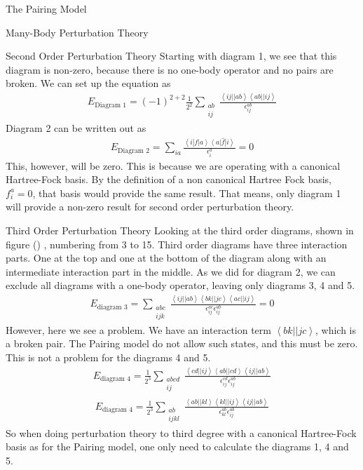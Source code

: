 \documentclass[twoside,english]{uiofysmaster}
\begin{document}
\begin{chapter}{The Pairing Model}
\begin{section}{Many-Body Perturbation Theory}
		\begin{subsection}{Second Order Perturbation Theory}
			Starting with diagram 1, we see that this diagram is non-zero, because there is no one-body operator and no pairs are broken. We can set up the equation as
			\begin{align}
				E_\text{Diagram 1} = (-1)^{2+2} \frac{1}{2^2} \sum_{\substack{ab \\ ij}} \frac{\left< ij || ab \right> \left< ab || ij \right>}{\epsilon_{ij}^{ab}}
			\end{align}
			Diagram 2 can be written out as
			\begin{align}
				E_\text{Diagram 2} = \sum_{ia} \frac{\left<i\right|f\left|a\right> \left<a\right| \hat f \left| i \right>}{\epsilon_i^a} = 0
			\end{align}
			This, however, will be zero. This is because we are operating with a canonical Hartree-Fock basis. By the definition of a non canonical Hartree Fock basis, $f_i^a = 0$, that basis would provide the same result. That means, only diagram 1 will provide a non-zero result for second order perturbation theory. 

		\end{subsection}

		\begin{subsection}{Third Order Perturbation Theory}
			Looking at the third order diagrams, shown in figure () , numbering from 3 to 15. Third order diagrams have three interaction parts. One at the top and one at the bottom of the diagram along with an intermediate interaction part in the middle. As we did for diagram 2, we can exclude all diagrams with a one-body operator, leaving only diagrams 3, 4 and 5. 
			\begin{align}
				E_{\text{diagram 3}} = \sum_{\substack{abc \\ ijk}} \frac{\left<ij||ab\right>\left<bk||jc\right>\left<ac||ij\right>}{\epsilon_{ij}^{ac} \epsilon_{ij}^{ab}} = 0
			\end{align}
			However, here we see a problem. We have an interaction term $\left<bk||jc\right>$, which is a broken pair. The Pairing model do not allow such states, and this must be zero. This is not a problem for the diagrams 4 and 5. 
			\begin{align}
				E_{\text{diagram 4}} = \frac{1}{2^3} \sum_{\substack{abcd \\ ij}} \frac{\left<cd||ij\right>\left<ab||cd\right>\left<ij||ab\right>}{\epsilon_{ij}^{cd} \epsilon_{ij}^{ab}}
			\end{align}
			\begin{align}
				E_{\text{diagram 4}} = \frac{1}{2^3} \sum_{\substack{ab \\ ijkl}} \frac{\left<ab||kl\right>\left<kl||ij\right>\left<ij||ab\right>}{\epsilon_{kl}^{ab} \epsilon_{ij}^{ab}}
			\end{align}
			So when doing perturbation theory to third degree with a canonical Hartree-Fock basis as for the Pairing model, one only need to calculate the diagrams 1, 4 and 5. 


\end{subsection}
\end{section}
\end{chapter}
\end{document}
